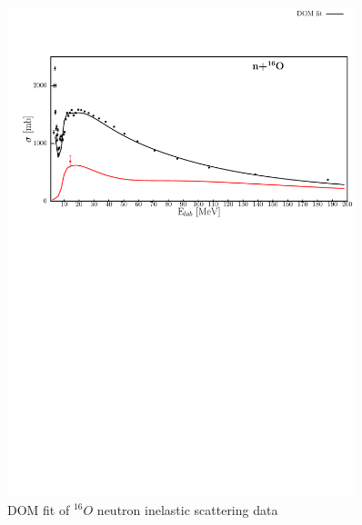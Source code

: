 \begin{figure}
\begin{center}
\includegraphics[width = 0.9\textwidth]{figures/o16_neutronInelastic.png}
\caption{DOM fit of $^{16}O$ neutron inelastic scattering data}
\label{o16NeutronInelastic}
\end{center}
\end{figure}

